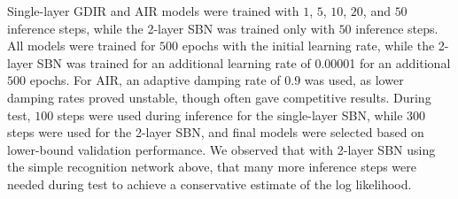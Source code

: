 \documentclass{article} %
\begin{document}
Single-layer GDIR and AIR models were trained with $1$, $5$, $10$, $20$, and $50$ inference steps, while the 2-layer SBN was trained only with $50$ inference steps. All
models were trained for $500$ epochs with the initial learning rate, while the 2-layer SBN was trained for an additional learning rate of \num{0.00001} for an additional $500$ epochs. For AIR, an
adaptive damping rate of $0.9$ was used, as lower damping rates proved unstable, though often gave competitive results.
During test, $100$ steps were used during inference for the single-layer SBN, while $300$ steps were used for the 2-layer SBN, and final models were selected based on lower-bound validation performance. We observed that with 2-layer SBN using the simple recognition network above, that many more inference steps were needed during test to achieve a conservative estimate of the log likelihood.
\end{document}
